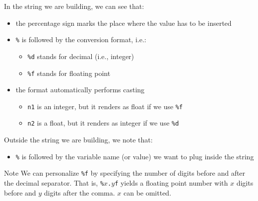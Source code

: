 \documentclass[t,handout,9pt]{beamer}
\begin{document}
\begin{frame}
\vfill
In the string we are building, we can see that:
\begin{itemize}
	\item the percentage sign marks the place where the value has to be inserted
	\item \texttt{\%} is followed by the conversion format, i.e.:
	\begin{itemize}
		\item \texttt{\%d} stands for decimal (i.e., integer)
		\item \texttt{\%f} stands for floating point
	\end{itemize}
	\item the format automatically performs casting
	\begin{itemize}
		\item \texttt{n1} is an integer, but it renders as float if we use \texttt{\%f}
		\item \texttt{n2} is a float, but it renders as integer if we use \texttt{\%d}
	\end{itemize}
\end{itemize}
\vfill
Outside the string we are building, we note that:
\begin{itemize}
	\item \texttt{\%} is followed by the variable name (or value) we want to plug inside the string
\end{itemize}
\vfill
\begin{block}{Note}
We can personalize \texttt{\%f} by specifying the number of digits before and after the decimal separator. That is, \texttt{\%$x$.$y$f} yields a floating point number with \texttt{$x$} digits before and \texttt{$y$} digits after the comma. \texttt{$x$} can be omitted.
\end{block}
\vfill
\end{frame}
%
\end{document}

